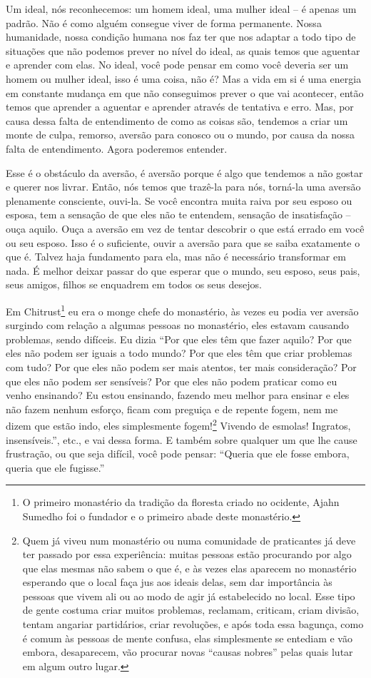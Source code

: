 Um ideal, nós reconhecemos: um homem ideal, uma mulher ideal – é
apenas um padrão. Não é como alguém consegue viver de forma permanente.
Nossa humanidade, nossa condição humana nos faz ter que nos adaptar a
todo tipo de situações que não podemos prever no nível do ideal, as
quais temos que aguentar e aprender com elas. No ideal, você pode
pensar em como você deveria ser um homem ou mulher ideal, isso é uma
coisa, não é? Mas a vida em si é uma energia em constante mudança em
que não conseguimos prever o que vai acontecer, então temos que
aprender a aguentar e aprender através de tentativa e erro. Mas, por
causa dessa falta de entendimento de como as coisas são, tendemos a
criar um monte de culpa, remorso, aversão para conosco ou o mundo, por
causa da nossa falta de entendimento. Agora poderemos entender.

Esse é o obstáculo da aversão, é aversão porque é algo que tendemos
a não gostar e querer nos livrar. Então, nós temos que trazê-la para
nós, torná-la uma aversão plenamente consciente, ouvi-la. Se você
encontra muita raiva por seu esposo ou esposa, tem a sensação de que
eles não te entendem, sensação de insatisfação – ouça aquilo. Ouça a
aversão em vez de tentar descobrir o que está errado em você ou seu
esposo. Isso é o suficiente, ouvir a aversão para que se saiba
exatamente o que é. Talvez haja fundamento para ela, mas não é
necessário transformar em nada. É melhor deixar passar do que esperar
que o mundo, seu esposo, seus pais, seus amigos, filhos se enquadrem em
todos os seus desejos.

Em Chitrust\footnote{O primeiro monastério da tradição da floresta
criado no ocidente, Ajahn Sumedho foi o fundador e o primeiro abade
deste monastério.} eu era o monge chefe do monastério, às vezes eu
podia ver aversão surgindo com relação a algumas pessoas no monastério,
eles estavam causando problemas, sendo difíceis. Eu dizia “Por que eles
têm que fazer aquilo? Por que eles não podem ser iguais a todo mundo?
Por que eles têm que criar problemas com tudo? Por que eles não podem
ser mais atentos, ter mais consideração? Por que eles não podem ser
sensíveis? Por que eles não podem praticar como eu venho ensinando? Eu
estou ensinando, fazendo meu melhor para ensinar e eles não fazem
nenhum esforço, ficam com preguiça e de repente fogem, nem me dizem que
estão indo, eles simplesmente fogem!\footnote{Quem já viveu num
monastério ou numa comunidade de praticantes já deve ter passado por
essa experiência: muitas pessoas estão procurando por algo que elas
mesmas não sabem o que é, e às vezes elas aparecem no monastério
esperando que o local faça jus aos ideais delas, sem dar importância às
pessoas que vivem ali ou ao modo de agir já estabelecido no local. Esse
tipo de gente costuma criar muitos problemas, reclamam, criticam, criam
divisão, tentam angariar partidários, criar revoluções, e após toda
essa bagunça, como é comum às pessoas de mente confusa, elas
simplesmente se entediam e vão embora, desaparecem, vão procurar novas
“causas nobres” pelas quais lutar em algum outro lugar.} Vivendo de
esmolas! Ingratos, insensíveis.”, etc., e vai dessa forma. E também
sobre qualquer um que lhe cause frustração, ou que seja difícil, você
pode pensar: “Queria que ele fosse embora, queria que ele fugisse.”

